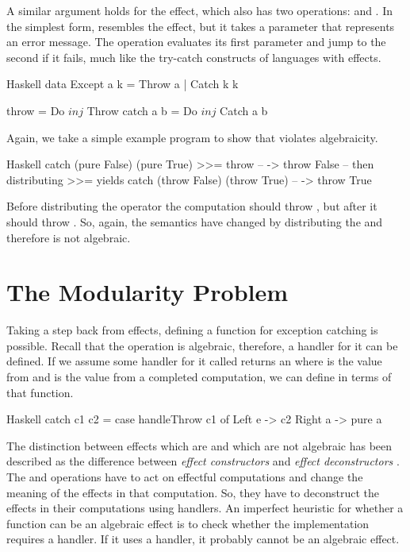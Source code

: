 A similar argument holds for the  effect, which also has two operations:  and . In the simplest form,  resembles the  effect, but it takes a parameter that represents an error message. The  operation evaluates its first parameter and jump to the second if it fails, much like the try-catch constructs of languages with effects.

\begin{lst}{Haskell}
data Except a k = Throw a | Catch k k

throw     = Do $ inj $ Throw
catch a b = Do $ inj $ Catch a b
\end{lst}
%
Again, we take a simple example program to show that  violates algebraicity.

\begin{lst}{Haskell}
catch (pure False)  (pure True)  >>= throw -- -> throw False
-- then distributing >>= yields
catch (throw False) (throw True)           -- -> throw True
\end{lst}
%
Before distributing the \hs{>>=} operator the computation should throw , but after it should throw . So, again, the semantics have changed by distributing the \hs{>>=} and therefore  is not algebraic.

\section{The Modularity Problem}

Taking a step back from effects, defining a function for exception catching is possible. Recall that the  operation is algebraic, therefore, a handler for it can be defined. If we assume some handler for it called  returns an  where  is the value from  and  is the value from a completed computation, we can define  in terms of that function.

\begin{lst}{Haskell}
catch c1 c2 =
  case handleThrow c1 of
    Left e -> c2
    Right a -> pure a
\end{lst}
%
The distinction between effects which are and which are not algebraic has been described as the difference between \emph{effect constructors} and \emph{effect deconstructors} \autocite{plotkin_algebraic_2003}. The  and  operations have to act on effectful computations and change the meaning of the effects in that computation. So, they have to deconstruct the effects in their computations using handlers. An imperfect heuristic for whether a function can be an algebraic effect is to check whether the implementation requires a handler. If it uses a handler, it probably cannot be an algebraic effect.

